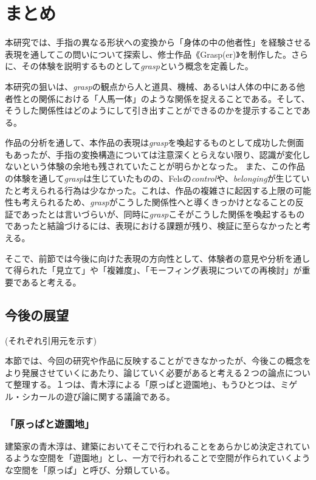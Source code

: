 \chapter{まとめ}
\label{matome}
本研究では、手指の異なる形状への変換から「身体の中の他者性」を経験させる表現を通してこの問いについて探索し、修士作品《Grasp(er)》を制作した。さらに、その体験を説明するものとして\textit{grasp}という概念を定義した。

本研究の狙いは、\textit{grasp}の観点から人と道具、機械、あるいは人体の中にある他者性との関係における「人馬一体」のような関係を捉えることである。そして、そうした関係性はどのようにして引き出すことができるのかを提示することである。

作品の分析を通して、本作品の表現は\textit{grasp}を喚起するものとして成功した側面もあったが、手指の変換構造については注意深くとらえない限り、認識が変化しないという体験の余地も残されていたことが明らかとなった。
また、この作品の体験を通して\textit{grasp}は生じていたものの、Felsの\textit{control}や、\textit{belonging}が生じていたと考えられる行為は少なかった。これは、作品の複雑さに起因する上限の可能性も考えられるため、\textit{grasp}がこうした関係性へと導くきっかけとなることの反証であったとは言いづらいが、同時に\textit{grasp}こそがこうした関係を喚起するものであったと結論づけるには、表現における課題が残り、検証に至らなかったと考える。

そこで、前節では今後に向けた表現の方向性として、体験者の意見や分析を通して得られた「見立て」や「複雑度」、「モーフィング表現についての再検討」が重要であると考える。

\section{今後の展望}
(それぞれ引用元を示す)

本節では、今回の研究や作品に反映することができなかったが、今後この概念をより発展させていくにあたり、論じていく必要があると考える２つの論点について整理する。１つは、青木淳による「原っぱと遊園地」、もうひとつは、ミゲル・シカールの遊び論に関する議論である。

\subsection{「原っぱと遊園地」}
建築家の青木淳は、建築においてそこで行われることをあらかじめ決定されているような空間を「遊園地」とし、一方で行われることで空間が作られていくような空間を「原っぱ」と呼び、分類している。

